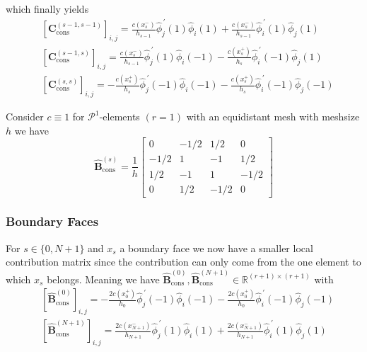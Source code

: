 which finally yields
\begin{align*}
    &[\textbf{C}_{\text{cons}}^{(s-1,s-1)}]_{i,j} = \frac{c(x_s^-)}{h_{s-1}} \widehat{\phi}_j^{\,\prime}(1) \widehat{\phi}_i(1) + \frac{c(x_s^-)}{h_{s-1}} \widehat{\phi}_i^{\,\prime} (1) \widehat{\phi}_j(1) \\
    &[\textbf{C}_{\text{cons}}^{(s-1,s)}]_{i,j} = \frac{c(x_s^-)}{h_{s-1}} \widehat{\phi}_j^{\,\prime} (1) \widehat{\phi}_i (-1) - \frac{c(x_s^+)}{h_{s}} \widehat{\phi}_i^{\,\prime} (-1) \widehat{\phi}_j (1) \\
    &[\textbf{C}_{\text{cons}}^{(s,s)}]_{i,j} = -\frac{c(x_s^+)}{h_s} \widehat{\phi}_j^{\,\prime} (-1) \widehat{\phi}_i (-1) - \frac{c(x_s^+)}{h_s} \widehat{\phi}_i^{\,\prime} (-1) \widehat{\phi}_j (-1)
\end{align*}
\begin{example}
Consider $c\equiv 1$ for $\mathcal{P}^1$-elements $(r=1)$ 
with an equidistant mesh with meshsize $h$ we have
\begin{equation*}
    \widehat{\textbf{B}}_{\text{cons}}^{(s)} = \frac{1}{h}
    \begin{bmatrix}
        0       & -1/2  & 1/2   & 0     \\
        -1/2    & 1     & -1    & 1/2   \\
        1/2     & -1    & 1     & -1/2  \\
        0       & 1/2   & -1/2  & 0
    \end{bmatrix}
\end{equation*}    
\end{example}

\subsubsection{Boundary Faces}
For $s\in \{0, N+1 \}$ and $x_s$ a boundary face we now have a smaller local contribution matrix 
since the contribution can only come from the one element to which $x_s$ belongs. Meaning we have
$\widehat{\textbf{B}}_{\text{cons}}^{(0)}, \widehat{\textbf{B}}_{\text{cons}}^{(N+1)} \in \mathbb{R}^{(r+1)\times (r+1)}$
with
\begin{align*}
    & [\widehat{\textbf{B}}_{\text{cons}}^{(0)}]_{i,j} = 
    -\frac{2 c(x_0^+)}{h_{0}} \widehat{\phi}_j^{\,\prime}(-1) \widehat{\phi}_i(-1) - \frac{2 c(x_0^+)}{h_{0}} \widehat{\phi}_i^{\,\prime} (-1) \widehat{\phi}_j(-1) \\
    & [\widehat{\textbf{B}}_{\text{cons}}^{(N+1)}]_{i,j} = 
    \frac{2 c(x_{N+1}^-)}{h_{N+1}} \widehat{\phi}_j^{\,\prime}(1) \widehat{\phi}_i(1) + \frac{ 2 c(x_{N+1}^-)}{h_{N+1}} \widehat{\phi}_i^{\,\prime} (1) \widehat{\phi}_j(1) \\
\end{align*}

